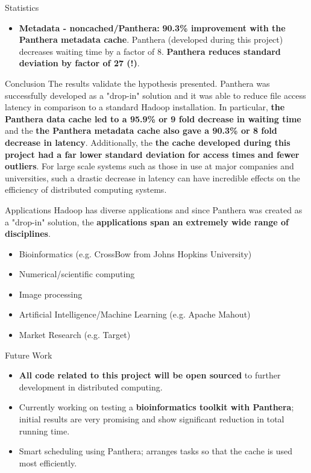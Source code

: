 \documentclass[final]{beamer} %
\begin{document}
\begin{frame}
\begin{columns}[t]
\begin{column}{0.32\textwidth}
\begin{block}{Statistics}
\begin{itemize}
    		\item \textbf{Metadata - noncached/Panthera: } \textbf{90.3\% improvement with the Panthera metadata cache}. Panthera (developed during this project) decreases waiting time by a factor of 8. \textbf{Panthera reduces standard deviation by factor of 27 (!)}.
    		
	\end{itemize}    	    
    \end{block}
    
    	\begin{block}{Conclusion}
	The results validate the hypothesis presented. Panthera was successfully developed as a "drop-in" solution and it was able to reduce file access latency in comparison to a standard Hadoop installation. In particular, \textbf{the Panthera data cache led to a 95.9\% or 9 fold decrease in waiting time} and the \textbf{the Panthera metadata cache also gave a 90.3\% or 8 fold decrease in latency}. Additionally, the \textbf{the cache developed during this project had a far lower standard deviation for access times and fewer outliers}. For large scale systems such as those in use at major companies and universities, such a drastic decrease in latency can have incredible effects on the efficiency of distributed computing systems.
	
	\end{block}
	
	\begin{block}{Applications}
	Hadoop has diverse applications and since Panthera was created as a "drop-in" solution, the \textbf{applications span an extremely wide range of disciplines}.
	\begin{itemize}
		\item Bioinformatics (e.g. CrossBow from Johns Hopkins University)
		\item Numerical/scientific computing 
		\item Image processing
		\item Artificial Intelligence/Machine Learning (e.g. Apache Mahout)
		\item Market Research (e.g. Target)
	\end{itemize}
	\end{block}
	
	\begin{block}{Future Work}
	\begin{itemize}
		\item \textbf{All code related to this project will be open sourced} to further development in distributed computing.
		\item Currently working on testing a \textbf{bioinformatics toolkit with Panthera}; initial results are very promising and show significant reduction in total running time.
		\item Smart scheduling using Panthera; arranges tasks so that the cache is used most efficiently.
		

\end{itemize}
\end{block}
\end{column}
\end{columns}
\end{frame}
\end{document}
